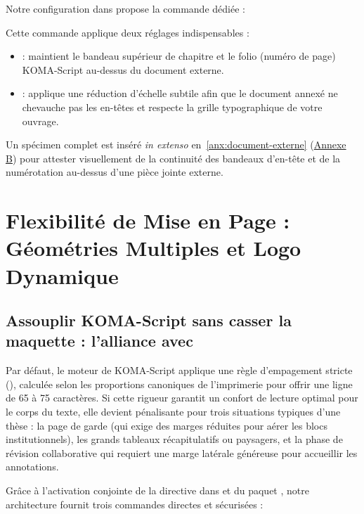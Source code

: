 Notre configuration dans  propose la commande dédiée :
\begin{center}
\end{center}

Cette commande applique deux réglages indispensables :
\begin{itemize}
  \item {} :
  maintient le bandeau supérieur de chapitre et le folio (numéro de page) KOMA-Script au-dessus du document externe.
  \item {} :
  applique une réduction d'échelle subtile afin que le document annexé ne chevauche pas les en-têtes et respecte la grille typographique de votre ouvrage.
\end{itemize}

Un spécimen complet est inséré \textit{in extenso} en~\cref{anx:document-externe} (\hyperref[anx:document-externe]{Annexe B}) pour attester visuellement de la continuité des bandeaux d'en-tête et de la numérotation au-dessus d'une pièce jointe externe.

\section{Flexibilité de Mise en Page : Géométries Multiples et Logo Dynamique}
\label{sec:geometries-logo}

\subsection{Assouplir KOMA-Script sans casser la maquette : l'alliance avec }
Par défaut, le moteur  de KOMA-Script applique une règle d'empagement stricte (),
calculée selon les proportions canoniques de l'imprimerie pour offrir une ligne de 65 à 75 caractères.
Si cette rigueur garantit un confort de lecture optimal pour le corps du texte,
elle devient pénalisante pour trois situations typiques d'une thèse :
la page de garde (qui exige des marges réduites pour aérer les blocs institutionnels),
les grands tableaux récapitulatifs ou paysagers,
et la phase de révision collaborative qui requiert une marge latérale généreuse pour accueillir les annotations.

Grâce à l'activation conjointe de la directive  dans 
et du paquet , notre architecture fournit trois commandes directes et sécurisées :

